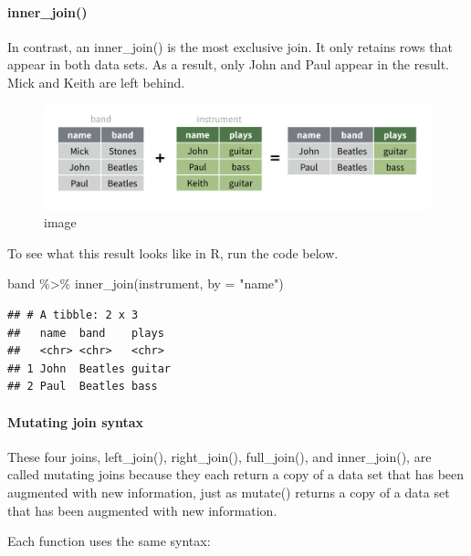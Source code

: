 \documentclass[
]{article}
\newenvironment{Shaded}{\begin{snugshade}}{\end{snugshade}}
\newcommand{\AttributeTok}[1]{\textcolor[rgb]{0.77,0.63,0.00}{#1}}
\newcommand{\FunctionTok}[1]{\textcolor[rgb]{0.00,0.00,0.00}{#1}}
\newcommand{\NormalTok}[1]{#1}
\newcommand{\SpecialCharTok}[1]{\textcolor[rgb]{0.00,0.00,0.00}{#1}}
\newcommand{\StringTok}[1]{\textcolor[rgb]{0.31,0.60,0.02}{#1}}
\begin{document}
\hypertarget{inner_join}{%
\paragraph{inner\_join()}\label{inner_join}}

In contrast, an inner\_join() is the most exclusive join. It only
retains rows that appear in both data sets. As a result, only John and
Paul appear in the result. Mick and Keith are left behind.

\begin{figure}
\centering
\includegraphics{data/inner-join.png}
\caption{image}
\end{figure}

To see what this result looks like in R, run the code below.

\begin{Shaded}
\begin{Highlighting}[]
\NormalTok{band }\SpecialCharTok{\%\textgreater{}\%} \FunctionTok{inner\_join}\NormalTok{(instrument, }\AttributeTok{by =} \StringTok{"name"}\NormalTok{)}
\end{Highlighting}
\end{Shaded}

\begin{verbatim}
## # A tibble: 2 x 3
##   name  band    plays 
##   <chr> <chr>   <chr> 
## 1 John  Beatles guitar
## 2 Paul  Beatles bass
\end{verbatim}

\hypertarget{mutating-join-syntax}{%
\paragraph{Mutating join syntax}\label{mutating-join-syntax}}

These four joins, left\_join(), right\_join(), full\_join(), and
inner\_join(), are called mutating joins because they each return a copy
of a data set that has been augmented with new information, just as
mutate() returns a copy of a data set that has been augmented with new
information.

Each function uses the same syntax:
\end{document}
